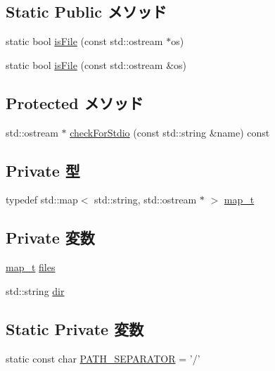 \subsection*{Static Public メソッド}
\begin{DoxyCompactItemize}
\item 
static bool \hyperlink{classOutputDirectory_ae3bf295c9f17497408567e6998762d10}{isFile} (const std::ostream $\ast$os)
\item 
static bool \hyperlink{classOutputDirectory_acff271d62941cd7e36ece902ad929692}{isFile} (const std::ostream \&os)
\end{DoxyCompactItemize}
\subsection*{Protected メソッド}
\begin{DoxyCompactItemize}
\item 
std::ostream $\ast$ \hyperlink{classOutputDirectory_ab4edf1444be4d8d0a64a0361e1f555d9}{checkForStdio} (const std::string \&name) const 
\end{DoxyCompactItemize}
\subsection*{Private 型}
\begin{DoxyCompactItemize}
\item 
typedef std::map$<$ std::string, std::ostream $\ast$ $>$ \hyperlink{classOutputDirectory_a45c5e1cccd11ddd0103631655703d5e2}{map\_\-t}
\end{DoxyCompactItemize}
\subsection*{Private 変数}
\begin{DoxyCompactItemize}
\item 
\hyperlink{classOutputDirectory_a45c5e1cccd11ddd0103631655703d5e2}{map\_\-t} \hyperlink{classOutputDirectory_a79dfc0070f515bcd2cb6cdd5282ad4d8}{files}
\item 
std::string \hyperlink{classOutputDirectory_ae1eb8abe7f66572b89cc139ca0c841ac}{dir}
\end{DoxyCompactItemize}
\subsection*{Static Private 変数}
\begin{DoxyCompactItemize}
\item 
static const char \hyperlink{classOutputDirectory_aa3d67123ee9a3ee4b138f06e57c2a54d}{PATH\_\-SEPARATOR} = '/'
\end{DoxyCompactItemize}


